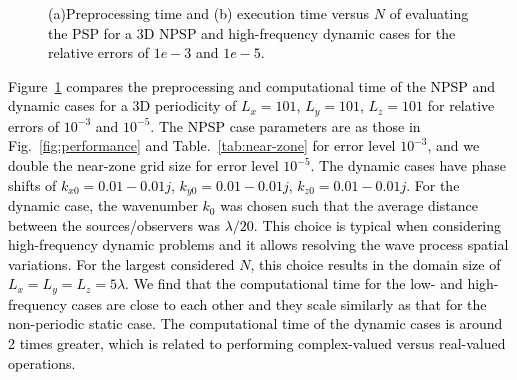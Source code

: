 \documentclass{article}
\begin{document}
\begin{figure}[htbp]
    \centering
    \quad
    \caption{\textcolor{black}{(a)Preprocessing time and (b) execution time versus $N$ of evaluating the PSP for a \textcolor{black}{3D NPSP} and high-frequency dynamic cases for the relative errors of $1e-3$ and $1e-5$.}}
    \label{fig:complex_real}
\end{figure}

\textcolor{black}{Figure~\ref{fig:complex_real} compares the preprocessing and computational time of the \textcolor{black}{NPSP} and dynamic cases for a 3D periodicity of $L_x =101$, $L_y =101$, $L_z =101$ for relative errors of $10^{-3}$ and $10^{-5}$. The \textcolor{black}{NPSP} case parameters are as those in Fig.~\ref{fig:performance} and Table.~\ref{tab:near-zone} for error level $10^{-3}$, and we double the near-zone grid size for error level $10^{-5}$. The dynamic cases have phase shifts of $k_{x0}=0.01-0.01j$, $k_{y0}=0.01-0.01j$, $k_{z0}=0.01-0.01j$. For the dynamic case, the wavenumber $k_0$ was chosen such that the average distance between the sources/observers was $\lambda/20$. This choice is typical when considering high-frequency dynamic problems and it allows resolving the wave process spatial variations. For the largest considered $N$, this choice results in the domain size of $L_x=L_y=L_z=5\lambda$. We find that the computational time for the low- and high-frequency cases are close to each other and they scale similarly as that for the non-periodic static case. The computational time of the dynamic cases is around 2 times greater, which is related to performing complex-valued versus real-valued operations. }
\end{document}
